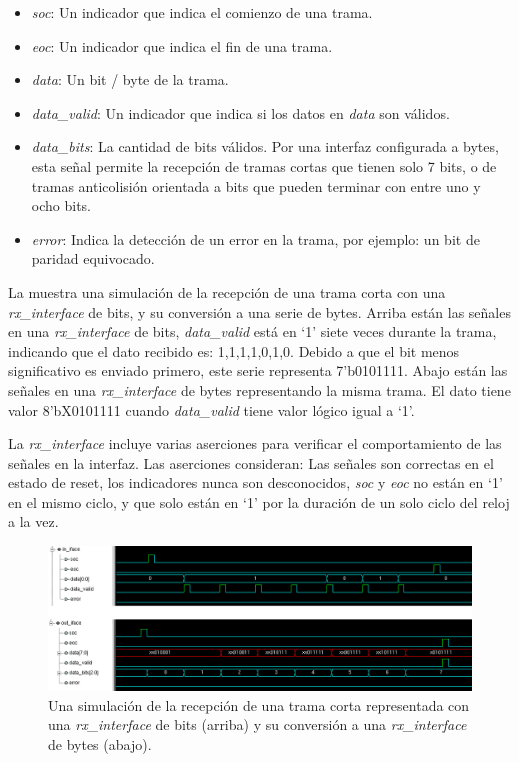 \documentclass[a4paper, twoside, 11pt]{report}
\begin{document}
\begin{itemize}
  \item \textit{soc}: Un indicador que indica el comienzo de una trama.
  \item \textit{eoc}: Un indicador que indica el fin de una trama.
  \item \textit{data}: Un bit / byte de la trama.
  \item \textit{data\_valid}: Un indicador que indica si los datos en \textit{data} son válidos.
  \item \textit{data\_bits}: La cantidad de bits válidos. Por una interfaz configurada a bytes, esta señal permite la recepción de tramas cortas que tienen solo 7 bits, o de tramas anticolisión orientada a bits que pueden terminar con entre uno y ocho bits.
  \item \textit{error}: Indica la detección de un error en la trama, por ejemplo: un bit de paridad equivocado.
\end{itemize}


La  muestra una simulación de la recepción de una trama corta con una \textit{rx\_interface} de bits, y su conversión a una serie de bytes. Arriba están las señales en una \textit{rx\_interface} de bits, \textit{data\_valid} está en ‘1’ siete veces durante la trama, indicando que el dato recibido es: 1,1,1,1,0,1,0. Debido a que el bit menos significativo es enviado primero, este serie representa 7’b0101111. Abajo están las señales en una \textit{rx\_interface} de bytes representando la misma trama. El dato tiene valor 8’bX0101111 cuando \textit{data\_valid} tiene valor lógico igual a ‘1’.

La \textit{rx\_interface} incluye varias aserciones para verificar el comportamiento de las señales en la interfaz. Las aserciones consideran: Las señales son correctas en el estado de reset, los indicadores nunca son desconocidos, \textit{soc} y \textit{eoc} no están en ‘1’ en el mismo ciclo, y que solo están en ‘1’ por la duración de un solo ciclo del reloj a la vez.

\begin{figure}[htb]
  \centering
  \includegraphics[width=1.0\textwidth]{./img/rx_iface_example}
  \caption{Una simulación de la recepción de una trama corta representada con una \textit{rx\_interface} de bits (arriba) y su conversión a una \textit{rx\_interface} de bytes (abajo).}
  \label{fig:rx_iface}
\end{figure}
\end{document}
